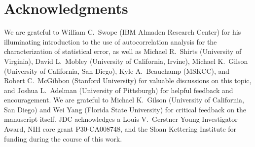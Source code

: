 \documentclass[aps,pre,twocolumn,nofootinbib,superscriptaddress,linenumbers,11point]{revtex4-1}
\begin{document}

\section*{Acknowledgments}

We are grateful to William C.~Swope (IBM Almaden Research Center) for his illuminating introduction to the use of autocorrelation analysis for the characterization of statistical error, as well as Michael R.~Shirts (University of Virginia), David L.~Mobley (University of California, Irvine), Michael K.~Gilson (University of California, San Diego), Kyle A.~Beauchamp (MSKCC), and Robert C.~McGibbon (Stanford University) for valuable discussions on this topic, and Joshua L.~Adelman (University of Pittsburgh) for helpful feedback and encouragement.
We are grateful to Michael K.~Gilson (University of California, San Diego) and Wei Yang (Florida State University) for critical feedback on the manuscript itself.
JDC acknowledges a Louis V.~Gerstner Young Investigator Award, NIH core grant P30-CA008748, and the Sloan Kettering Institute for funding during the course of this work.


 

\end{document}
